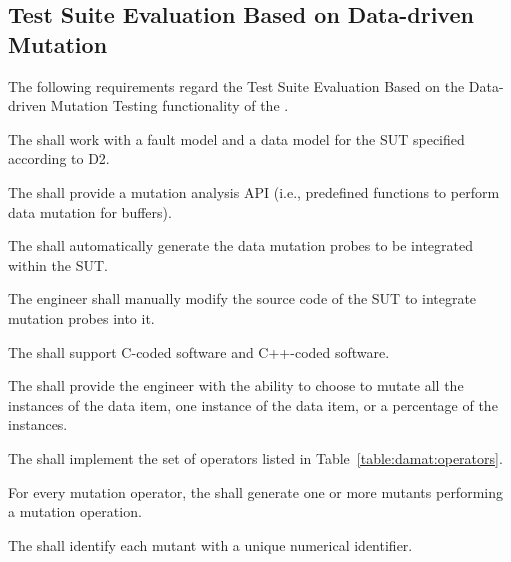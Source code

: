 

\subsection{Test Suite Evaluation Based on Data-driven Mutation}
\label{sec:dataDriven}

The following requirements regard the Test Suite Evaluation Based on the Data-driven Mutation Testing functionality of the \FAQAS.



\RQ{} The \FAQAS shall work with a fault model and a data model for the SUT specified according to D2.

\RQ{} The \FAQAS shall provide a mutation analysis API (i.e., predefined functions to perform data mutation for buffers).

\RQ{} The \FAQAS shall automatically generate the data mutation probes to be integrated within the SUT.

\RQ{} The engineer shall manually modify the source code of the SUT to integrate mutation probes into it.

\RQ{} The \FAQAS shall support C-coded software and C++-coded software.


%

\RQ{} The \FAQAS shall provide the engineer with the ability to choose to mutate all the instances of the data item, one instance of the data item, or a percentage of the instances.


\RQ{} The \FAQAS shall implement the set of operators listed in Table~\ref{table:damat:operators}.



\RQ{} For every mutation operator, the \FAQAS shall generate one or more mutants performing a mutation operation.

\RQ{} The \FAQAS shall identify each mutant with a unique numerical identifier.

